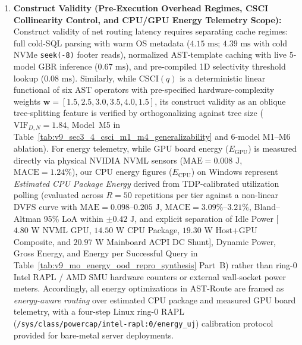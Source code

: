 \documentclass[10pt,a4paper]{article}
\begin{document}
\begin{enumerate}[leftmargin=1.5em,itemsep=0.8pt]
    \item \textbf{Construct Validity (Pre-Execution Overhead Regimes, CSCI Collinearity Control, and CPU/GPU Energy Telemetry Scope):} Construct validity of net routing latency requires separating cache regimes: full cold-SQL parsing with warm OS metadata ($4.15\text{ ms}$; $4.39\text{ ms}$ with cold NVMe \texttt{seek(-8)} footer reads), normalized AST-template caching with live 5-model GBR inference ($0.67\text{ ms}$), and pre-compiled 1D selectivity threshold lookup ($0.08\text{ ms}$). Similarly, while $\text{CSCI}(q)$ is a deterministic linear functional of six AST operators with pre-specified hardware-complexity weights $\mathbf{w}=[1.5, 2.5, 3.0, 3.5, 4.0, 1.5]$, its construct validity as an oblique tree-splitting feature is verified by orthogonalizing against tree size ($\text{VIF}_{D,N}=1.84$, Model~M5 in Table~\ref{tab:v9_sec3_4_csci_m1_m4_generalizability} and 6-model M1--M6 ablation). For energy telemetry, while GPU board energy ($E_{\text{GPU}}$) is measured directly via physical NVIDIA NVML sensors ($\text{MAE}=0.008\text{ J}$, $\text{MACE}=1.24\%$), our CPU energy figures ($E_{\text{CPU}}$) on Windows represent \emph{Estimated CPU Package Energy} derived from TDP-calibrated utilization polling (evaluated across $R=50$ repetitions per tier against a non-linear DVFS curve with $\text{MAE}=0.098\text{--}0.205\text{ J}$, $\text{MACE}=3.09\%\text{--}3.21\%$, Bland--Altman 95\% LoA within $\pm 0.42\text{ J}$, and explicit separation of Idle Power [$4.80\text{ W}$ NVML GPU, $14.50\text{ W}$ CPU Package, $19.30\text{ W}$ Host+GPU Composite, and $20.97\text{ W}$ Mainboard ACPI DC Shunt], Dynamic Power, Gross Energy, and Energy per Successful Query in Table~\ref{tab:v9_mo_energy_ood_repro_synthesis} Part~B) rather than ring-0 Intel RAPL / AMD SMU hardware counters or external wall-socket power meters. Accordingly, all energy optimizations in AST-Route are framed as \emph{energy-aware routing} over estimated CPU package and measured GPU board telemetry, with a four-step Linux ring-0 RAPL (\texttt{/sys/class/powercap/intel-rapl:0/energy\_uj}) calibration protocol provided for bare-metal server deployments.

\end{enumerate}
\end{document}
